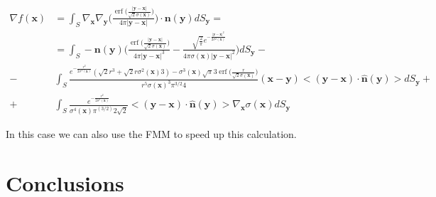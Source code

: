\documentclass[11pt]{article}
\DeclareMathOperator\erf{erf}
\newcommand\bx{\boldsymbol x}
\newcommand\by{\boldsymbol y}
\newcommand\bn{\boldsymbol n}
\begin{document}
\begin{equation}
\begin{aligned}
\nabla f(\bx)&=\int_{\mathit{S}}\nabla_{\bx}\nabla_{\by}\Big(\frac{\erf\big(\frac{|\by-\bx|}{\sqrt{2}\sigma(\bx)}\big)}{4\pi|\by-\bx|}\Big)\cdot\bn(\by)dS_{\by}=\\
&=\int_{\mathit{S}}-\bn(\by)\Bigg(\frac{\erf\big(\frac{|\by-\bx|}{\sqrt{2}\sigma(\bx)}\big)}{4\pi|\by-\bx|^3}-\frac{\sqrt{\frac{2}{\pi}}e^{-\frac{|\by-\bx|^2}{2\sigma^2(\bx)}}}{4\pi\sigma(\bx)|\by-\bx|^2}\Bigg)dS_{\by}-\\
-&\int_{\mathit{S}} \frac{e^{-\frac{r^2}{2\sigma^2(\bx)}}(\sqrt{2}r^3+\sqrt{2}r\sigma^2(\bx)3)-\sigma^3(\bx)\sqrt{\pi}3\erf{\big(\frac{r}{\sqrt{2}\sigma(\bx)}}\big)}{r^5\sigma(\bx)^3\pi^{3/2}4}(\bx-\by)<(\by-\bx)\cdot \hat{\bn}(\by)>dS_{\by}+\\
+&\int_{\mathit{S}} \frac{e^{-\frac{r^2}{2\sigma^2(\bx)}}}{\sigma^4(\bx)\pi^(3/2)2\sqrt{2}}<(\by-\bx)\cdot \hat{\bn}(\by)>\nabla_{\bx}\sigma(\bx)dS_{\by}
\end{aligned}
\end{equation}

In this case we can also use the FMM to speed up this calculation.






\section{Conclusions}































  
\end{document}
